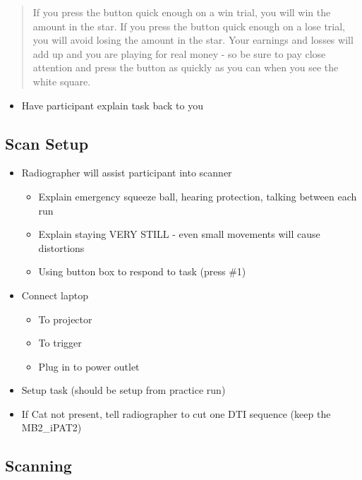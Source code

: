 \documentclass[
]{book}
\providecommand{\tightlist}{%
  \setlength{\itemsep}{0pt}\setlength{\parskip}{0pt}}
\begin{document}
\begin{quote}
If you press the button quick enough on a win trial, you will win the amount in the star. If you press the button quick enough on a lose trial, you will avoid losing the amount in the star. Your earnings and losses will add up and you are playing for real money - so be sure to pay close attention and press the button as quickly as you can when you see the white square.
\end{quote}

\begin{itemize}
\tightlist
\item
  Have participant explain task back to you
\end{itemize}

\hypertarget{scan-setup}{%
\subsection{Scan Setup}\label{scan-setup}}

\begin{itemize}
\tightlist
\item
  Radiographer will assist participant into scanner

  \begin{itemize}
  \tightlist
  \item
    Explain emergency squeeze ball, hearing protection, talking between each run
  \item
    Explain staying VERY STILL - even small movements will cause distortions
  \item
    Using button box to respond to task (press \#1)
  \end{itemize}
\item
  Connect laptop

  \begin{itemize}
  \tightlist
  \item
    To projector
  \item
    To trigger
  \item
    Plug in to power outlet
  \end{itemize}
\item
  Setup task (should be setup from practice run)
\item
  If Cat not present, tell radiographer to cut one DTI sequence (keep the MB2\_iPAT2)
\end{itemize}

\hypertarget{scanning}{%
\subsection{Scanning}\label{scanning}}
\end{document}

